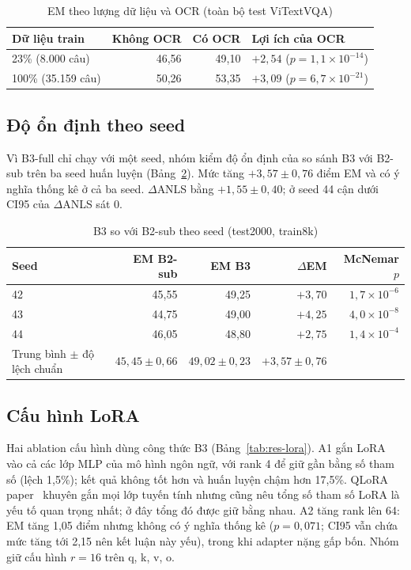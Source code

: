 \begin{table}[htbp]
\caption{EM theo lượng dữ liệu và OCR (toàn bộ test ViTextVQA)}
\label{tab:res-data}
\centering
\small
\begin{tabular}{lrrp{}}
\toprule
\textbf{Dữ liệu train} & \textbf{Không OCR} & \textbf{Có OCR} & \textbf{Lợi ích của OCR} \\
\midrule
23\% (8.000 câu) & 46,56 & 49,10 & $+2{,}54$ ($p = 1{,}1\times10^{-14}$) \\
100\% (35.159 câu) & 50,26 & 53,35 & $+3{,}09$ ($p = 6{,}7\times10^{-21}$) \\
\bottomrule
\end{tabular}
\end{table}

\subsection{Độ ổn định theo seed}

Vì B3-full chỉ chạy với một seed, nhóm kiểm độ ổn định của so sánh B3 với B2-sub
trên ba seed huấn luyện (Bảng~\ref{tab:res-seed}). Mức tăng $+3{,}57 \pm 0{,}76$
điểm EM và có ý nghĩa thống kê ở cả ba seed. $\Delta$ANLS bằng
$+1{,}55 \pm 0{,}40$; ở seed 44 cận dưới CI95 của $\Delta$ANLS sát 0.

\begin{table}[htbp]
\caption{B3 so với B2-sub theo seed (test2000, train8k)}
\label{tab:res-seed}
\centering
\small
\begin{tabular}{lrrrr}
\toprule
\textbf{Seed} & \textbf{EM B2-sub} & \textbf{EM B3} & \textbf{$\Delta$EM} & \textbf{McNemar $p$} \\
\midrule
42 & 45,55 & 49,25 & $+3{,}70$ & $1{,}7\times10^{-6}$ \\
43 & 44,75 & 49,00 & $+4{,}25$ & $4{,}0\times10^{-8}$ \\
44 & 46,05 & 48,80 & $+2{,}75$ & $1{,}4\times10^{-4}$ \\
\midrule
Trung bình $\pm$ độ lệch chuẩn & $45{,}45 \pm 0{,}66$ & $49{,}02 \pm 0{,}23$ & $+3{,}57 \pm 0{,}76$ & \\
\bottomrule
\end{tabular}
\end{table}

\subsection{Cấu hình LoRA}

Hai ablation cấu hình dùng công thức B3 (Bảng~\ref{tab:res-lora}). A1 gắn LoRA vào
cả các lớp MLP của mô hình ngôn ngữ, với rank 4 để giữ gần bằng số tham số
(lệch 1,5\%); kết quả không tốt hơn và huấn luyện chậm hơn 17,5\%. QLoRA
paper~\cite{dettmers2023qlora} khuyên gắn mọi lớp tuyến tính nhưng cũng nêu tổng
số tham số LoRA là yếu tố quan trọng nhất; ở đây tổng đó được giữ bằng nhau. A2
tăng rank lên 64: EM tăng 1,05 điểm nhưng không có ý nghĩa thống kê ($p = 0{,}071$;
CI95 vẫn chứa mức tăng tới 2,15 nên kết luận này yếu), trong khi adapter nặng gấp
bốn. Nhóm giữ cấu hình $r = 16$ trên q, k, v, o.

